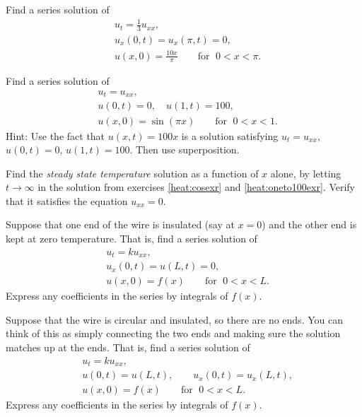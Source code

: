 \documentclass{ximera}
\begin{document}
\begin{exercise} \label{heat:cosexr}
    Find a series solution of
    \begin{align*}
        & u_t = \frac{1}{3} u_{xx} , \\
        & u_x(0,t) = u_x(\pi,t) = 0 , \\
        & u(x,0) = \frac{10x}{\pi} \qquad \text{for } \; 0 < x < \pi .
    \end{align*}
\end{exercise}

\begin{exercise} \label{heat:oneto100exr}
    Find a series solution of
    \begin{align*}
        & u_t =  u_{xx} , \\
        & u(0,t) = 0 , \quad u(1,t) = 100 , \\
        & u(x,0) = \sin (\pi x) \qquad \text{for } \; 0 < x < 1 .
    \end{align*}
    Hint: Use the fact that $u(x,t) = 100 x$ is a solution satisfying $u_t = u_{xx}$, $u(0,t) = 0$, $u(1,t) = 100$.  Then use superposition.
\end{exercise}

\begin{exercise}
    Find the \emph{steady state temperature} solution as a function of $x$ alone, by letting $t \to \infty$ in the solution from exercises \ref{heat:cosexr} and \ref{heat:oneto100exr}. Verify that it satisfies the equation $u_{xx} = 0$.
\end{exercise}

\begin{exercise}%
    Suppose that one end of the wire is insulated (say at $x=0$) and the other end is kept at zero temperature.  That is, find a series solution of
    \begin{align*}
        & u_t = k u_{xx} , \\
        & u_x(0,t) = u(L,t) = 0 , \\
        & u(x,0) = f(x) \qquad \text{for } \; 0 < x < L .
    \end{align*}
    Express any coefficients in the series by integrals of $f(x)$.
\end{exercise}

\begin{exercise}%
    Suppose that the wire is circular and insulated, so there are no ends. You can think of this as simply connecting the two ends and making sure the solution matches up at the ends. That is, find a series solution of
    \begin{align*}
        & u_t = k u_{xx} , \\
        & u(0,t) = u(L,t) , \qquad u_x(0,t) = u_x(L,t) , \\
        & u(x,0) = f(x) \qquad \text{for } \; 0 < x < L .
    \end{align*}
    Express any coefficients in the series by integrals of $f(x)$.
\end{exercise}
\end{document}
